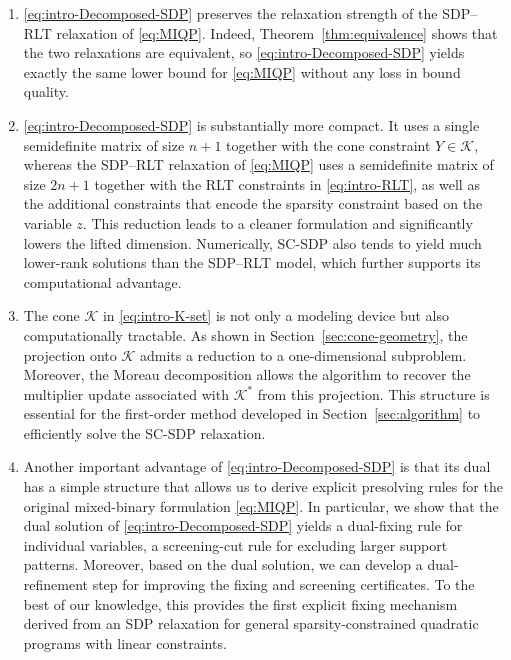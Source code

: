 \documentclass[11pt]{article}
\def\K{\mathcal{K}}
\theoremstyle{plain}
\begin{document}
\begin{enumerate}[itemsep=2pt, topsep=4pt]
    \item \eqref{eq:intro-Decomposed-SDP} preserves the relaxation strength of the SDP--RLT relaxation of \eqref{eq:MIQP}. Indeed, Theorem~\ref{thm:equivalence} shows that the two relaxations are equivalent, so \eqref{eq:intro-Decomposed-SDP} yields exactly the same lower bound for \eqref{eq:MIQP} without any loss in bound quality.
    \item \eqref{eq:intro-Decomposed-SDP} is substantially more compact. It uses a single semidefinite matrix of size $n+1$ together with the cone constraint $Y\in\K$, whereas the SDP--RLT relaxation of \eqref{eq:MIQP} uses a semidefinite matrix of size $2n+1$ together with the RLT constraints in \eqref{eq:intro-RLT}, as well as the 
    additional constraints that encode the sparsity constraint based on the variable $z$. 
    This reduction leads to a cleaner formulation and significantly lowers the lifted dimension. Numerically, SC-SDP also tends to yield much lower-rank solutions than the SDP--RLT model, which further supports its computational advantage.
    \item The cone $\K$ in \eqref{eq:intro-K-set} is not only a modeling device but also computationally tractable. As shown in Section~\ref{sec:cone-geometry}, the projection onto $\K$ admits a reduction to a one-dimensional subproblem. Moreover, the Moreau decomposition allows the algorithm to recover the multiplier update associated with $\K^*$ from this projection. This structure is essential for the first-order method developed in Section~\ref{sec:algorithm} to efficiently solve the SC-SDP 
    relaxation.
    \item Another important advantage of \eqref{eq:intro-Decomposed-SDP}
    is that its dual has a simple structure that allows us to derive explicit presolving rules for the original mixed-binary formulation \eqref{eq:MIQP}. In particular, we show that the dual solution of \eqref{eq:intro-Decomposed-SDP} yields a dual-fixing rule for individual variables, a screening-cut rule for excluding larger support patterns. Moreover, based on the dual solution, we can develop
    a dual-refinement step for improving the fixing and screening certificates. To the best of our knowledge, this provides the first explicit fixing mechanism derived from an SDP relaxation for general sparsity-constrained quadratic programs with linear constraints.
\end{enumerate}
\end{document}
